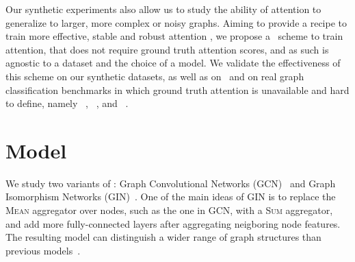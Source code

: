 Our synthetic experiments also allow us to study the ability of attention \gnns to generalize to larger, more complex or noisy graphs. Aiming to provide a recipe to train more effective, stable and robust attention \gnns, we propose a \wsup~scheme to train attention, that does not require ground truth attention scores, and as such is agnostic to a dataset and the choice of a model.
We validate the effectiveness of this scheme on our synthetic datasets, as well as on \mnistfull~and on real graph classification benchmarks in which ground truth attention is unavailable and hard to define, namely \collab~\citep{leskovec2007graph, shrivastava2014new}, \proteins~\citep{borgwardt2005protein}, and \dd~\citep{dobson2003distinguishing}.

\section{Model}

We study two variants of \gnns: Graph Convolutional Networks (GCN)~\citep{kipf2016semi} and Graph Isomorphism Networks (GIN)~\citep{xu2018powerful}. One of the main ideas of GIN is to replace the \textsc{Mean} aggregator over nodes, such as the one in GCN, with a \textsc{Sum} aggregator, and add more fully-connected layers after aggregating neigboring node features. The resulting model can distinguish a wider range of graph structures than previous models~\cite[Figure 3]{xu2018powerful}.

